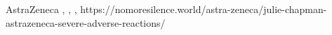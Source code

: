                 {
                }
                {
                }
                {
                  AstraZeneca
                }
                {
                }
                {
                  ,
                  ,
                  ,
                }
                {
                  https://nomoresilence.world/astra-zeneca/julie-chapman-astrazeneca-severe-adverse-reactions/
                }
